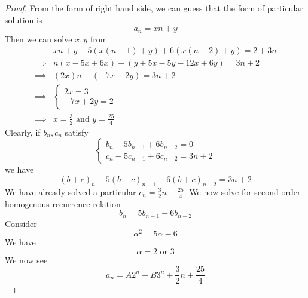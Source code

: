 \documentclass{report}
\begin{document}
\begin{proof}
From the form of right hand side, we can guess that the form of particular solution is 
\begin{equation*}
a_n=xn+y
\end{equation*}
Then we can solve $x,y$ from 
\begin{align*}
&xn+y-5(x(n-1)+y)+6(x(n-2)+y)=2+3n\\
  \implies & n(x-5x+6x)+(y+5x-5y-12x+6y)=3n+2\\
  \implies  &(2x)n+(-7x+2y)=3n+2\\
  \implies &\begin{cases}
    2x=3\\
    -7x+2y=2
  \end{cases}\\
    \implies &x=\frac{3}{2}\text{ and }y=\frac{25}{4}
\end{align*}
Clearly, if $b_n,c_n$ satisfy 
 \begin{equation*}
\begin{cases}
  b_n-5b_{n-1}+6b_{n-2}=0\\
  c_n-5c_{n-1}+6c_{n-2}=3n+2
\end{cases}
\end{equation*}
we have 
\begin{equation*}
  (b+c)_n-5(b+c)_{n-1}+6(b+c)_{n-2}=3n+2
\end{equation*}
We have already solved  a particular $c_n=\frac{3}{2}n+\frac{25}{4}$. We now solve for second order homogenous recurrence relation 
\begin{equation*}
b_n=5b_{n-1}-6b_{n-2}
\end{equation*}
Consider 
\begin{equation*}
\alpha^2=5\alpha-6
\end{equation*}
We have 
\begin{equation*}
\alpha=2\text{ or }3
\end{equation*}
We now see 
\begin{equation*}
a_n=A 2^n+B 3^n+\frac{3}{2}n+\frac{25}{4}
\end{equation*}
\end{proof}
\end{document}
